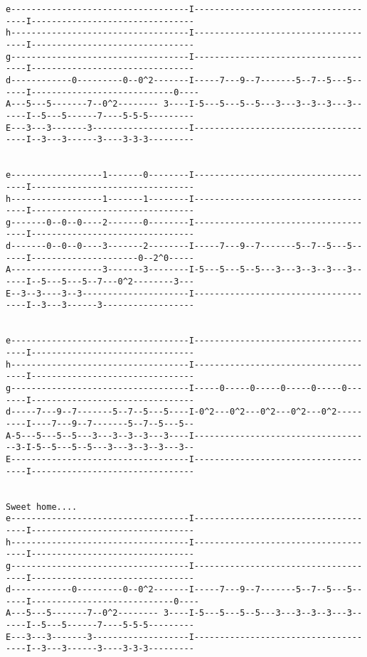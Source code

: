 \begin{verbatim}
e-----------------------------------I-------------------------------------I--------------------------------
h-----------------------------------I-------------------------------------I--------------------------------
g-----------------------------------I-------------------------------------I--------------------------------
d------------0---------0--0^2-------I-----7---9--7-------5--7--5---5------I----------------------------0----
A---5---5-------7--0^2-------- 3----I-5---5---5--5---3---3--3--3---3------I--5---5------7----5-5-5---------
E---3---3-------3-------------------I-------------------------------------I--3---3------3----3-3-3---------


e------------------1-------0--------I-------------------------------------I--------------------------------
h------------------1-------1--------I-------------------------------------I--------------------------------
g-------0--0--0----2-------0--------I-------------------------------------I--------------------------------
d-------0--0--0----3-------2--------I-----7---9--7-------5--7--5---5------I---------------------0--2^0-----
A------------------3-------3--------I-5---5---5--5---3---3--3--3---3------I--5---5---5--7---0^2--------3---
E--3--3----3--3---------------------I-------------------------------------I--3---3------3------------------


e-----------------------------------I-------------------------------------I--------------------------------
h-----------------------------------I-------------------------------------I--------------------------------
g-----------------------------------I-----0-----0-----0-----0-----0-------I--------------------------------
d-----7---9--7-------5--7--5---5----I-0^2---0^2---0^2---0^2---0^2---------I----7---9--7-------5--7--5---5--
A-5---5---5--5---3---3--3--3---3----I-----------------------------------3-I-5--5---5--5---3---3--3--3---3--
E-----------------------------------I-------------------------------------I--------------------------------


Sweet home....
e-----------------------------------I-------------------------------------I--------------------------------
h-----------------------------------I-------------------------------------I--------------------------------
g-----------------------------------I-------------------------------------I--------------------------------
d------------0---------0--0^2-------I-----7---9--7-------5--7--5---5------I----------------------------0----
A---5---5-------7--0^2-------- 3----I-5---5---5--5---3---3--3--3---3------I--5---5------7----5-5-5---------
E---3---3-------3-------------------I-------------------------------------I--3---3------3----3-3-3---------


\end{verbatim}
